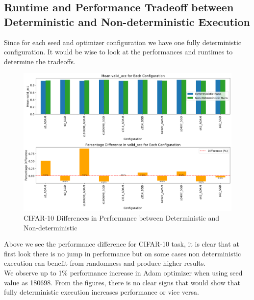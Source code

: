 \subsection{Runtime and Performance Tradeoff between Deterministic and Non-deterministic Execution}

Since for each seed and optimizer configuration we have one fully deterministic configuration. It would be wise to look at the performances and runtimes to determine the tradeoffs.\\

\begin{figure}[h!]
  \centering
  \includegraphics[width=1\textwidth]{figures/cifar_performance.png}
  \caption{CIFAR-10 Differences in Performance between Deterministic and Non-deterministic}
  \label{fig:cifar10_dif_per}
\end{figure}

Above we see the performance difference for CIFAR-10 task, it is clear that at first look there is no jump in performance but on some cases non deterministic execution can benefit from randomness and produce higher results.\\
We observe up to 1\% performance increase in Adam optimizer when using seed value as 180698. From the figures, there is no clear signs that would show that fully deterministic execution increases performance or vice versa.\\

